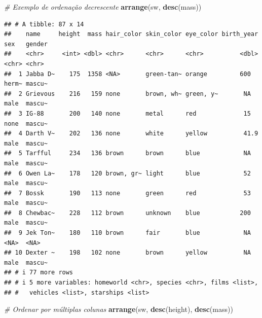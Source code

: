 \documentclass[
]{book}
\newenvironment{Shaded}{\begin{snugshade}}{\end{snugshade}}
\newcommand{\CommentTok}[1]{\textcolor[rgb]{0.56,0.35,0.01}{\textit{#1}}}
\newcommand{\FunctionTok}[1]{\textcolor[rgb]{0.13,0.29,0.53}{\textbf{#1}}}
\newcommand{\NormalTok}[1]{#1}
\begin{document}
\begin{Shaded}
\begin{Highlighting}[]
\CommentTok{\# Exemplo de ordenação decrescente}
\FunctionTok{arrange}\NormalTok{(sw, }\FunctionTok{desc}\NormalTok{(mass))}
\end{Highlighting}
\end{Shaded}

\begin{verbatim}
## # A tibble: 87 x 14
##    name     height  mass hair_color skin_color eye_color birth_year sex   gender
##    <chr>     <int> <dbl> <chr>      <chr>      <chr>          <dbl> <chr> <chr> 
##  1 Jabba D~    175  1358 <NA>       green-tan~ orange         600   herm~ mascu~
##  2 Grievous    216   159 none       brown, wh~ green, y~       NA   male  mascu~
##  3 IG-88       200   140 none       metal      red             15   none  mascu~
##  4 Darth V~    202   136 none       white      yellow          41.9 male  mascu~
##  5 Tarfful     234   136 brown      brown      blue            NA   male  mascu~
##  6 Owen La~    178   120 brown, gr~ light      blue            52   male  mascu~
##  7 Bossk       190   113 none       green      red             53   male  mascu~
##  8 Chewbac~    228   112 brown      unknown    blue           200   male  mascu~
##  9 Jek Ton~    180   110 brown      fair       blue            NA   <NA>  <NA>  
## 10 Dexter ~    198   102 none       brown      yellow          NA   male  mascu~
## # i 77 more rows
## # i 5 more variables: homeworld <chr>, species <chr>, films <list>,
## #   vehicles <list>, starships <list>
\end{verbatim}

\begin{Shaded}
\begin{Highlighting}[]
\CommentTok{\# Ordenar por múltiplas colunas}
\FunctionTok{arrange}\NormalTok{(sw, }\FunctionTok{desc}\NormalTok{(height), }\FunctionTok{desc}\NormalTok{(mass))}
\end{Highlighting}
\end{Shaded}
\end{document}
